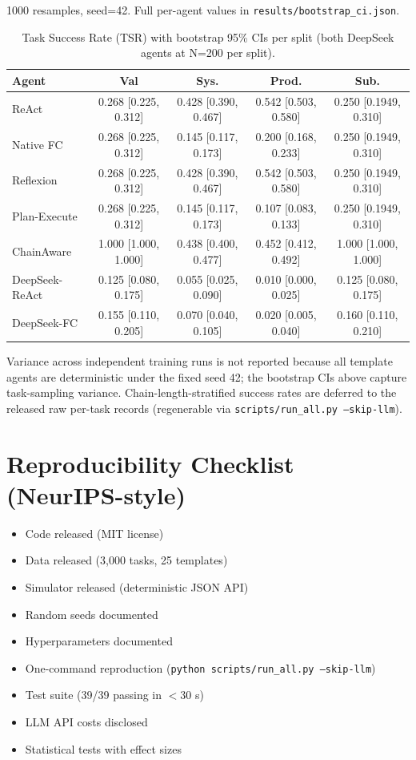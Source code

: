 ﻿\documentclass{article}
\begin{document}
1000 resamples, seed=42. Full per-agent values in \texttt{results/bootstrap\_ci.json}.

\begin{table}[h]
\centering
\small
\begin{tabular}{lcccc}
\toprule
Agent & Val & Sys. & Prod. & Sub. \\
\midrule
ReAct & 0.268 [0.225, 0.312] & 0.428 [0.390, 0.467] & 0.542 [0.503, 0.580] & 0.250 [0.1949, 0.310] \\
Native FC & 0.268 [0.225, 0.312] & 0.145 [0.117, 0.173] & 0.200 [0.168, 0.233] & 0.250 [0.1949, 0.310] \\
Reflexion & 0.268 [0.225, 0.312] & 0.428 [0.390, 0.467] & 0.542 [0.503, 0.580] & 0.250 [0.1949, 0.310] \\
Plan-Execute & 0.268 [0.225, 0.312] & 0.145 [0.117, 0.173] & 0.107 [0.083, 0.133] & 0.250 [0.1949, 0.310] \\
ChainAware & 1.000 [1.000, 1.000] & 0.438 [0.400, 0.477] & 0.452 [0.412, 0.492] & 1.000 [1.000, 1.000] \\
DeepSeek-ReAct & 0.125 [0.080, 0.175] & 0.055 [0.025, 0.090] & 0.010 [0.000, 0.025] & 0.125 [0.080, 0.175] \\
DeepSeek-FC & 0.155 [0.110, 0.205] & 0.070 [0.040, 0.105] & 0.020 [0.005, 0.040] & 0.160 [0.110, 0.210] \\
\bottomrule
\end{tabular}
\caption{Task Success Rate (TSR) with bootstrap 95\% CIs per split (both DeepSeek agents at N=200 per split).}
\label{tab:bootstrap_ci}
\end{table}


Variance across independent training runs is not reported because all template agents are deterministic under the fixed seed 42; the bootstrap CIs above capture task-sampling variance. Chain-length-stratified success rates are deferred to the released raw per-task records (regenerable via \texttt{scripts/run\_all.py --skip-llm}).

\section{Reproducibility Checklist (NeurIPS-style)}

\begin{itemize}
    \item[\checkmark] Code released (MIT license)
    \item[\checkmark] Data released (3{,}000 tasks, 25 templates)
    \item[\checkmark] Simulator released (deterministic JSON API)
    \item[\checkmark] Random seeds documented
    \item[\checkmark] Hyperparameters documented
    \item[\checkmark] One-command reproduction (\texttt{python scripts/run\_all.py --skip-llm})
    \item[\checkmark] Test suite (39/39 passing in $<$30 s)
    \item[\checkmark] LLM API costs disclosed
    \item[\checkmark] Statistical tests with effect sizes
\end{itemize}
\end{document}
